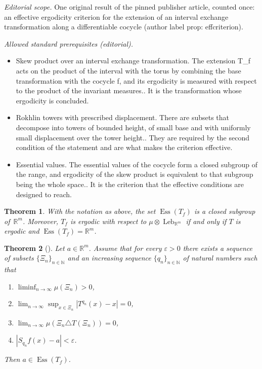 \documentclass[10pt,a4paper]{article}
\let\epsilon\varepsilon
\DeclareMathOperator{\Ess}{Ess}
\DeclareMathOperator{\Leb}{Leb}
\theoremstyle{plain}
\newtheorem{theorem}{Theorem}[section]
\theoremstyle{definition}
\newcommand{\N}{\mathbb{N}}
\newcommand{\R}{\mathbb{R}}
\begin{document}
\noindent\textit{Editorial scope.} One original result of the pinned publisher article, counted once: an effective ergodicity criterion for the extension of an interval exchange transformation along a differentiable cocycle (author label prop: effcriterion).\par\medskip
\noindent\textit{Allowed standard prerequisites (editorial).}\begin{itemize}
\item Skew product over an interval exchange transformation. The extension T\_f acts on the product of the interval with the torus by combining the base transformation with the cocycle f, and its ergodicity is measured with respect to the product of the invariant measures.. It is the transformation whose ergodicity is concluded.
\item Rokhlin towers with prescribed displacement. There are subsets that decompose into towers of bounded height, of small base and with uniformly small displacement over the tower height.. They are required by the second condition of the statement and are what makes the criterion effective.
\item Essential values. The essential values of the cocycle form a closed subgroup of the range, and ergodicity of the skew product is equivalent to that subgroup being the whole space.. It is the criterion that the effective conditions are designed to reach.
\end{itemize}\medskip
\begin{theorem}\label{thm: essvalues}
With the notation as above, the set $\Ess(T_f)$ is a closed subgroup of~$\R^m$. Moreover, $T_f$ is ergodic with respect to $\mu\otimes \Leb_{\R^m}$ if and only if $T$ is ergodic and $\Ess(T_f)=\R^m$.
\end{theorem}

\begin{theorem}[{\cite[Lem.\,2.7]{conze_cocycles_2011}}]\label{thm: FUcriterion}
Let $a\in\R^m$. Assume that for every $\epsilon>0$ there exists a sequence
of subsets $\{\Xi_n\}_{n\in\N}$ and an increasing sequence
$\{q_n\}_{n\in\N}$ of natural numbers such that
\begin{enumerate}
\item \label{cond:measure} $\liminf_{n\to\infty}\mu(\Xi_n)>0$,
\item \label{cond:rigidity}$\lim_{n\to\infty}\sup_{x\in \Xi_n}|T^{q_n}(x)-x|=0$,
\item \label{cond:almost_invariant} $\lim_{n\to\infty}\mu(\Xi_n\triangle T(\Xi_n))=0$,
\item \label{cond:BS} $|S_{q_n}f(x)-a|<\epsilon$.
\end{enumerate}
Then $a\in \Ess(T_f)$.
\end{theorem}
\end{document}
